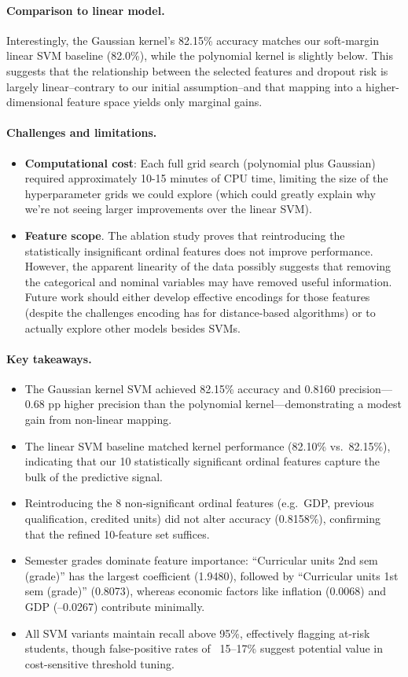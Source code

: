 \documentclass[12pt]{article}
\begin{document}
\paragraph{Comparison to linear model.}  
Interestingly, the Gaussian kernel’s 82.15\% accuracy matches our soft-margin linear SVM baseline (82.0\%), while the polynomial kernel is slightly below. This suggests that the relationship between the selected features and dropout risk is largely linear--contrary to our initial assumption--and that mapping into a higher-dimensional feature space yields only marginal gains.

\paragraph{Challenges and limitations.}
\begin{itemize}
  \item \textbf{Computational cost}: Each full grid search (polynomial plus Gaussian) required approximately 10-15 minutes of CPU time, limiting the size of the hyperparameter grids we could explore (which could greatly explain why we're not seeing larger improvements over the linear SVM).
    \item \textbf{Feature scope}. The ablation study proves that reintroducing the statistically insignificant ordinal features does not improve performance. However, the apparent linearity of the data possibly suggests that removing the categorical and nominal variables may have removed useful information. Future work should either develop effective encodings for those features (despite the challenges encoding has for distance-based algorithms) or to actually explore other models besides SVMs.
\end{itemize}

\paragraph{Key takeaways.}
\begin{itemize}
  \item The Gaussian kernel SVM achieved 82.15\% accuracy and 0.8160 precision—0.68 pp higher precision than the polynomial kernel—demonstrating a modest gain from non-linear mapping.
  \item The linear SVM baseline matched kernel performance (82.10\% vs.\ 82.15\%), indicating that our 10 statistically significant ordinal features capture the bulk of the predictive signal.
  \item Reintroducing the 8 non-significant ordinal features (e.g.\ GDP, previous qualification, credited units) did not alter accuracy (0.8158\%), confirming that the refined 10-feature set suffices.
  \item Semester grades dominate feature importance: “Curricular units 2nd sem (grade)” has the largest coefficient (1.9480), followed by “Curricular units 1st sem (grade)” (0.8073), whereas economic factors like inflation (0.0068) and GDP (–0.0267) contribute minimally.
  \item All SVM variants maintain recall above 95\%, effectively flagging at-risk students, though false-positive rates of ~15–17\% suggest potential value in cost-sensitive threshold tuning.
\end{itemize}
\end{document}
